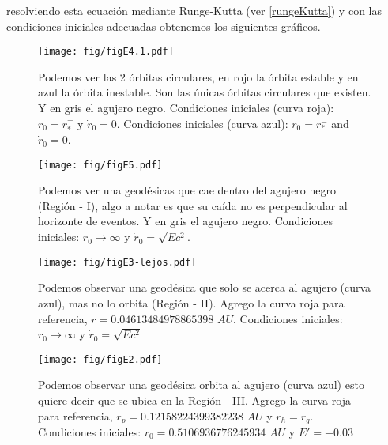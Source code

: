 \documentclass[../Main.tex]{subfiles}
\begin{document}
resolviendo esta ecuación mediante Runge-Kutta (ver \ref{rungeKutta}) y con las condiciones iniciales adecuadas obtenemos los siguientes gráficos. 

\begin{figure}[H]
    \centering
    \texttt{[image: fig/figE4.1.pdf]}
    \caption{Podemos ver las 2 órbitas circulares, en rojo la órbita estable y en azul la órbita inestable. Son las únicas órbitas circulares que existen. Y en gris el agujero negro. Condiciones iniciales (curva roja): $r_0=r_{*}^+$ y $\dot{r}_0=0$. Condiciones iniciales (curva azul):  $r_0=r_{*}^-$ and $\dot{r}_0=0$. }
    \label{timelike:circular}
\end{figure}
\begin{figure}[H]
    \centering
    \texttt{[image: fig/figE5.pdf]}
    \caption{Podemos ver una geodésicas que cae dentro del agujero negro (Región - I), algo a notar es que su caída no es perpendicular al horizonte de eventos. Y en gris el agujero negro. Condiciones iniciales: $r_0\rightarrow\infty$ y $\dot{r}_0=\sqrt{Ec^2}$.}
    \label{timelike:caida}
\end{figure}

\newpage

\begin{figure}[H]
    \centering
    \texttt{[image: fig/figE3-lejos.pdf]}
    \caption{Podemos observar una geodésica que solo se acerca al agujero (curva azul), mas no lo orbita (Región - II). Agrego la curva roja para referencia, $r=0.04613484978865398\,\,AU$. Condiciones iniciales: $r_0\rightarrow\infty$ y $\dot{r}_0=\sqrt{Ec^2}$}
    \label{timelike:acerca}
\end{figure}

\begin{figure}[H]
    \centering
    \texttt{[image: fig/figE2.pdf]}
    \caption{Podemos observar una geodésica orbita al agujero (curva azul) esto quiere decir que se ubica en la Región - III. Agrego la curva roja para referencia, $r_{p}=0.12158224399382238\,\,AU$ y $r_{h} = r_{g}$. Condiciones iniciales: $r_0=0.5106936776245934\,\,AU$ y $E'=-0.03$}
\end{figure}
\end{document}
